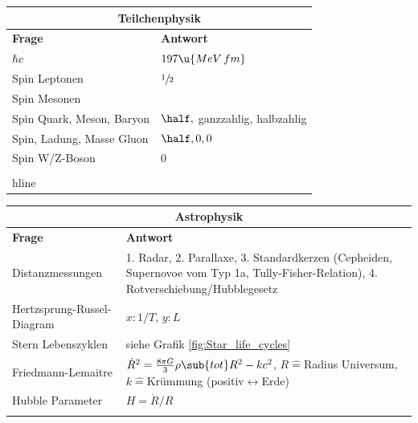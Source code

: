 \documentclass[final]{summery_5.0}
\begin{document}
\begin{table}[H]
    \centering
    \begin{tabular}{|p{7cm}|p{7cm}|}
        \multicolumn{2}{c}{\large \bf Teilchenphysik}\\
        \hline
        {\bf Frage} & {\bf Antwort}\\\hline 
        $\hbar c$& $197\u{MeV\, fm}$\\\hline
        Spin Leptonen & $\sfrac12$\\\hline
        Spin Mesonen &\\\hline
        Spin Quark, Meson, Baryon& $\half,$ ganzzahlig, halbzahlig\\\hline
        Spin, Ladung, Masse Gluon& $\half, 0,0$\\\hline
        Spin W/Z-Boson& 0 \\\\hline
\end{tabular}
\end{table}

\begin{table}[H]
    \centering
    \begin{tabular}{|p{7cm}|p{7cm}|}
        \multicolumn{2}{c}{\large \bf Astrophysik}\\
        \hline
        {\bf Frage} & {\bf Antwort}\\\hline 
        Distanzmessungen & 1. Radar, 2. Parallaxe, 3. Standardkerzen (Cepheiden, Supernovoe vom Typ 1a, Tully-Fisher-Relation), 4. Rotverschiebung/Hubblegesetz \\\hline
        Hertzsprung-Russel-Diagram & $x:1/T$, $y:L$\\\hline
        Stern Lebenszyklen& siehe Grafik \ref{fig:Star_life_cycles} \\\hline
        Friedmann-Lemaitre& $\dot R ^2 = \frac{8\pi G}{3} \rho\sub{tot} R^2  - kc^2$, $R\hat = $Radius Universum, $k\hat =$Krümmung (positiv$\leftrightarrow$Erde)\\\hline
        Hubble Parameter & $H=\dot R/R$\\\hline
        &\\\hline
\end{tabular}
\end{table}
\end{document}
